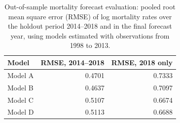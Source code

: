 \begin{table}[ht]
\centering
\caption{Out-of-sample mortality forecast evaluation: pooled root mean square error (RMSE) of log mortality rates over the holdout period 2014--2018 and in the final forecast year, using models estimated with observations from 1998 to 2013.}
\label{tab:outofsample_mortality_rmse}
\begin{tabular}{lrr}
\hline
Model & RMSE, 2014--2018 & RMSE, 2018 only \\
\hline
Model A & 0.4701 & 0.7333 \\
Model B & 0.4637 & 0.7097 \\
Model C & 0.5107 & 0.6674 \\
Model D & 0.5113 & 0.6688 \\
\hline
\end{tabular}
\end{table}
